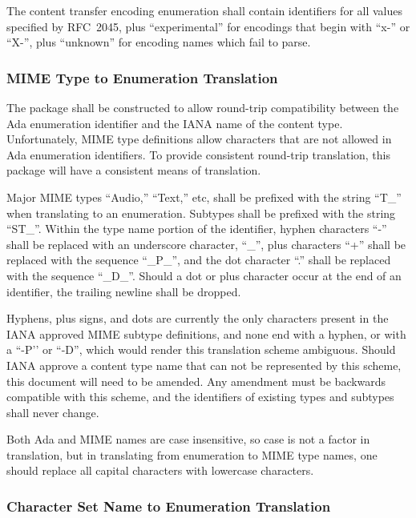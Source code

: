 \documentclass[11pt]{article}
\begin{document}
The content transfer encoding enumeration shall contain identifiers
for all values specified by RFC~2045, plus ``experimental'' for
encodings that begin with ``x-'' or ``X-'', plus ``unknown'' for encoding
names which fail to parse.

\subsubsection{MIME Type to Enumeration Translation}
\label{sr:mime-to-enumeration-translation}

The package shall be constructed to allow round-trip compatibility
between the Ada enumeration identifier and the IANA name of the content
type. Unfortunately, MIME type definitions allow characters that are
not allowed in Ada enumeration identifiers. To provide consistent
round-trip translation, this package will have a consistent means of
translation.

Major MIME types {``Audio,''} {``Text,''} etc, shall be prefixed with
the string {``T\_''} when translating to an enumeration. Subtypes
shall be prefixed with the string {``ST\_''}. Within the type name
portion of the identifier, hyphen characters {``-''} shall be replaced
with an underscore character, {``\_'',} plus characters {``+''} shall
be replaced with the sequence {``\_P\_'',} and the dot character ``.''
shall be replaced with the sequence {``\_D\_''.} Should a dot or plus
character occur at the end of an identifier, the trailing newline
shall be dropped.

Hyphens, plus signs, and dots are currently the only characters
present in the IANA approved MIME subtype definitions, and none end
with a hyphen, or with a {``-P'}' or {``-D'',} which would render this
translation scheme ambiguous. Should IANA approve a content type name
that can not be represented by this scheme, this document will need to
be amended. Any amendment must be backwards compatible with this
scheme, and the identifiers of existing types and subtypes shall never
change.

Both Ada and MIME names are case insensitive, so case is not a factor
in translation, but in translating from enumeration to MIME type
names, one should replace all capital characters with lowercase
characters.  

\subsubsection{Character Set Name to Enumeration Translation}
\end{document}

